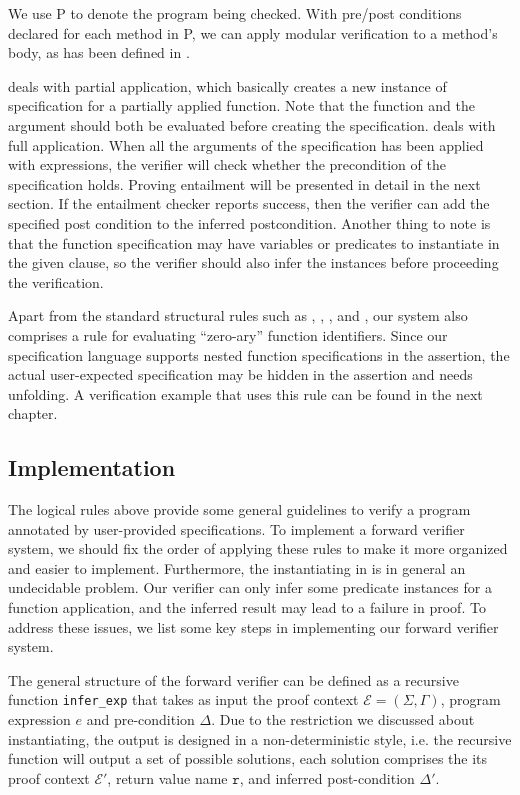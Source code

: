We use P to denote the program being checked. With pre/post conditions declared for each method in P, we can apply modular verification to a method’s body, as has been defined in . 

 deals with partial application, which basically creates a new instance of specification for a partially applied function. Note that the function and the argument should both be evaluated before creating the specification.  deals with full application. When all the arguments of the specification has been applied with expressions, the verifier will check whether the precondition of the specification holds. Proving entailment will be presented in detail in the next section. If the entailment checker reports success, then the verifier can add the specified post condition to the inferred postcondition. Another thing to note is that the function specification may have variables or predicates to instantiate in the given clause, so the verifier should also infer the instances before proceeding the verification.

Apart from the standard structural rules such as , , , and , our system also comprises a rule  for evaluating ``zero-ary'' function identifiers. Since our specification language supports nested function specifications in the assertion, the actual user-expected specification may be hidden in the assertion and needs unfolding. A verification example that uses this rule can be found in the next chapter.


\subsection{Implementation}

The logical rules above provide some general guidelines to verify a program annotated by user-provided specifications. To implement a forward verifier system, we should fix the order of applying these rules to make it more organized and easier to implement. Furthermore, the instantiating in  is in general an undecidable problem. Our verifier can only infer some predicate instances for a function application, and the inferred result may lead to a failure in proof. To address these issues, we list some key steps in implementing our forward verifier system.

The general structure of the forward verifier can be defined as a recursive function \texttt{infer\_exp} that takes as input the proof context $\mathcal{E}=(\Sigma,\Gamma)$, program expression $e$ and pre-condition $\Delta$. Due to the restriction we discussed about instantiating, the output is designed in a non-deterministic style, i.e. the recursive function will output a set of possible solutions, each solution comprises the its proof context $\mathcal{E'}$, return value name $\mathtt{r}$, and inferred post-condition $\Delta'$.

